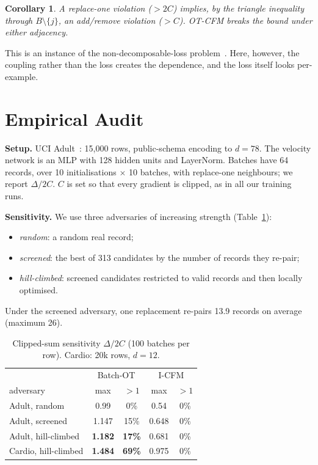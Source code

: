 \documentclass[journal]{IEEEtran}
\newtheorem{corollary}{Corollary}
\begin{document}
\begin{corollary}
A replace-one violation ($>2C$) implies, by the triangle inequality through $B\setminus\{j\}$, an add/remove violation ($>C$). OT-CFM breaks the bound under either adjacency.
\end{corollary}

This is an instance of the non-decomposable-loss problem~\cite{kong2025nondecomposable}. Here, however, the coupling rather than the loss creates the dependence, and the loss itself looks per-example.

\section{Empirical Audit}\label{sec:audit}
\textbf{Setup.} UCI Adult~\cite{becker1996adult}: 15{,}000 rows, public-schema encoding to $d=78$. The velocity network is an MLP with 128 hidden units and LayerNorm. Batches have 64 records, over 10 initialisations $\times$ 10 batches, with replace-one neighbours; we report $\Delta/2C$. $C$ is set so that every gradient is clipped, as in all our training runs.

\textbf{Sensitivity.} We use three adversaries of increasing strength (Table~\ref{tab:sens}):
\begin{itemize}
\item \emph{random}: a random real record;
\item \emph{screened}: the best of 313 candidates by the number of records they re-pair;
\item \emph{hill-climbed}: screened candidates restricted to valid records and then locally optimised.
\end{itemize}
Under the screened adversary, one replacement re-pairs 13.9 records on average (maximum 26).

\begin{table}[t]\centering\caption{Clipped-sum sensitivity $\Delta/2C$ (100 batches per row). Cardio: 20k rows, $d=12$.}\label{tab:sens}
\begin{tabular}{lcccc}\toprule
& \multicolumn{2}{c}{Batch-OT} & \multicolumn{2}{c}{I-CFM}\\
adversary & max & $>1$ & max & $>1$\\\midrule
Adult, random & 0.99 & 0\% & 0.54 & 0\%\\
Adult, screened & 1.147 & 15\% & 0.648 & 0\%\\
Adult, hill-climbed & \textbf{1.182} & \textbf{17\%} & 0.681 & 0\%\\
Cardio, hill-climbed & \textbf{1.484} & \textbf{69\%} & 0.975 & 0\%\\\bottomrule
\end{tabular}\end{table}
\end{document}
